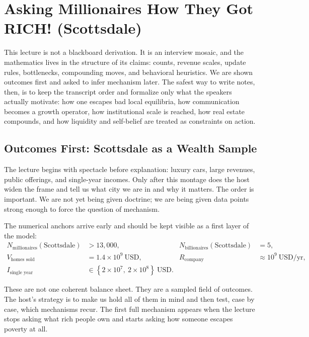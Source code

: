 \chapter{Asking Millionaires How They Got RICH! (Scottsdale)}

This lecture is not a blackboard derivation. It is an interview mosaic, and the mathematics lives in the structure of its claims: counts, revenue scales, update rules, bottlenecks, compounding moves, and behavioral heuristics. We are shown outcomes first and asked to infer mechanism later. The safest way to write notes, then, is to keep the transcript order and formalize only what the speakers actually motivate: how one escapes bad local equilibria, how communication becomes a growth operator, how institutional scale is reached, how real estate compounds, and how liquidity and self-belief are treated as constraints on action.

\section{Outcomes First: Scottsdale as a Wealth Sample}

The lecture begins with spectacle before explanation: luxury cars, large revenues, public offerings, and single-year incomes. Only after this montage does the host widen the frame and tell us what city we are in and why it matters. The order is important. We are not yet being given doctrine; we are being given data points strong enough to force the question of mechanism.

The numerical anchors arrive early and should be kept visible as a first layer of the model:
\begin{align}
N_{\text{millionaires}}(\text{Scottsdale}) &> 13{,}000, &
N_{\text{billionaires}}(\text{Scottsdale}) &= 5, \\
V_{\text{homes sold}} &= 1.4\times 10^9\ \text{USD}, &
R_{\text{company}} &\approx 10^9\ \text{USD/yr}, \\
I_{\text{single year}} &\in \left\{2\times 10^7,\ 2\times 10^8\right\}\ \text{USD}.
\end{align}

These are not one coherent balance sheet. They are a sampled field of outcomes. The host's strategy is to make us hold all of them in mind and then test, case by case, which mechanisms recur. The first full mechanism appears when the lecture stops asking what rich people own and starts asking how someone escapes poverty at all.

